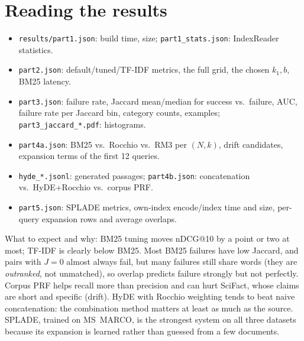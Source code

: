 \documentclass[11pt,a4paper]{article}
\begin{document}
\section{Reading the results}
\begin{itemize}[nosep]
  \item \texttt{results/part1.json}: build time, size; \texttt{part1\_stats.json}: IndexReader statistics.
  \item \texttt{part2.json}: default/tuned/TF-IDF metrics, the full grid, the chosen $k_1,b$, BM25 latency.
  \item \texttt{part3.json}: failure rate, Jaccard mean/median for success vs.\ failure, AUC, failure rate per Jaccard bin, category counts, examples; \texttt{part3\_jaccard\_*.pdf}: histograms.
  \item \texttt{part4a.json}: BM25 vs.\ Rocchio vs.\ RM3 per $(N,k)$, drift candidates, expansion terms of the first 12 queries.
  \item \texttt{hyde\_*.jsonl}: generated passages; \texttt{part4b.json}: concatenation vs.\ HyDE+Rocchio vs.\ corpus PRF.
  \item \texttt{part5.json}: SPLADE metrics, own-index encode/index time and size, per-query expansion rows and average overlaps.
\end{itemize}
What to expect and why: BM25 tuning moves nDCG@10 by a point or two at most; TF-IDF is clearly below BM25. Most BM25 failures
have low Jaccard, and pairs with $J{=}0$ almost always fail, but many failures still share words (they are \emph{outranked},
not unmatched), so overlap predicts failure strongly but not perfectly. Corpus PRF helps recall more than precision and can
hurt SciFact, whose claims are short and specific (drift). HyDE with Rocchio weighting tends to beat naive concatenation:
the combination method matters at least as much as the source. SPLADE, trained on MS~MARCO, is the strongest system on all
three datasets because its expansion is learned rather than guessed from a few documents.
\end{document}

